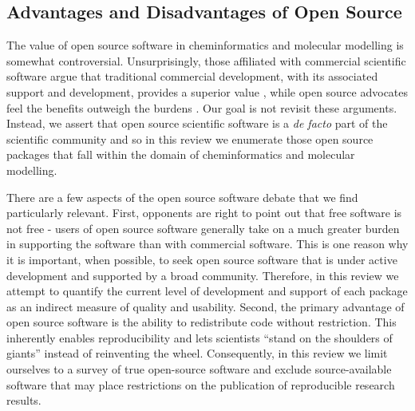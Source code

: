 \subsection*{Advantages and Disadvantages of Open Source}

The value of open source software in cheminformatics and molecular modelling is somewhat controversial.  Unsurprisingly, those affiliated with commercial scientific software argue that traditional commercial development, with its associated support and development, provides a superior value \cite{Krylov_2015}, while open source advocates feel the benefits outweigh the burdens \cite{Gezelter_2015,Jacob_2016}. Our goal is not revisit these arguments.  Instead, we assert that open source scientific software is a \textit{de facto} part of the scientific community and so in this review we enumerate those open source packages that fall within the domain of cheminformatics and molecular modelling.

There are a few aspects of the open source software debate that we find particularly relevant.  First, opponents are right to point out that free software is not free - users of open source software generally take on a much greater burden in supporting the software than with commercial software.  This is one reason why it is important, when possible, to seek open source software that is under active development and supported by a broad community.  Therefore, in this review we attempt to quantify the current level of development and support of each package as an indirect measure of quality and usability.  Second, the primary advantage of open source software is the ability to redistribute code without restriction.  This inherently enables reproducibility and lets scientists ``stand on the shoulders of giants'' instead of reinventing the wheel. Consequently, in this review we limit ourselves to a survey of true open-source software and exclude source-available software that may place restrictions on the publication of reproducible research results.


